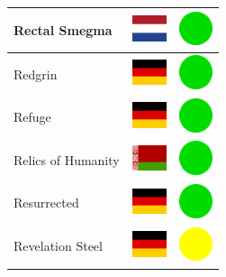 \documentclass[12pt, a4paper, twoside]{report}
\begin{document}
\begin{center}
\begin{longtable}{|p{5cm}|p{2cm}|p{2cm}|}
Rectal Smegma & \includegraphics[width=1cm]{4x3/nl} & \includegraphics[width=1cm]{likes/y} \\ \hline
Redgrin & \includegraphics[width=1cm]{4x3/de} & \includegraphics[width=1cm]{likes/y} \\ \hline
Refuge & \includegraphics[width=1cm]{4x3/de} & \includegraphics[width=1cm]{likes/y} \\ \hline
Relics of Humanity & \includegraphics[width=1cm]{4x3/by} & \includegraphics[width=1cm]{likes/y} \\ \hline
Resurrected & \includegraphics[width=1cm]{4x3/de} & \includegraphics[width=1cm]{likes/y} \\ \hline
Revelation Steel & \includegraphics[width=1cm]{4x3/de} & \includegraphics[width=1cm]{likes/m} \\ \hline

\end{longtable}
\end{center}
\end{document}
